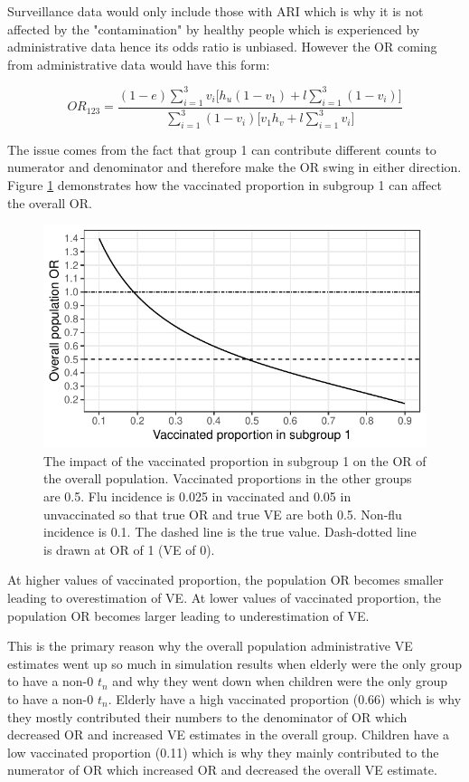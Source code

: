 \documentclass[11pt]{article}
\begin{document}
Surveillance data would only include those with ARI which is why it is not affected by the "contamination" by healthy people which is experienced by administrative data hence its odds ratio is unbiased. However the OR coming from administrative data would have this form:

\begin{equation} \label{ORBad}
OR_{1 2 3} = \frac
{(1-e) \sum_{i=1}^3 v_i \Big[ h_u(1-v_1) + l\sum_{i=1}^3(1-v_i) \Big]}
{\sum_{i=1}^3 (1-v_i) \Big[ v_1h_v+l \sum_{i=1}^3 v_i \Big]}
\end{equation}

The issue comes from the fact that group 1 can contribute different counts to numerator and denominator and therefore make the OR swing in either direction. Figure \ref{fig:ortn} demonstrates how the vaccinated proportion in subgroup 1 can affect the overall OR.

\pagebreak

\begin{figure}[h]
	\centering
		\includegraphics[width=0.75\linewidth]{../fig-ortn/fig-ortn.pdf}
		\caption{
The impact of the vaccinated proportion in subgroup 1 on the OR of the overall population. Vaccinated proportions in the other groups are 0.5. Flu incidence is 0.025 in vaccinated and 0.05 in unvaccinated so that true OR and true VE are both 0.5. Non-flu incidence is 0.1. The dashed line is the true value. Dash-dotted line is drawn at OR of 1 (VE of 0). \label{fig:ortn}
		}
\end{figure}

At higher values of vaccinated proportion, the population OR becomes smaller leading to overestimation of VE. At lower values of vaccinated proportion, the population OR becomes larger leading to underestimation of VE.

This is the primary reason why the overall population administrative VE estimates went up so much in simulation results when elderly were the only group to have a non-0 $t_n$ and why they went down when children were the only group to have a non-0 $t_n$. Elderly have a high vaccinated proportion (0.66) which is why they mostly contributed their numbers to the denominator of OR which decreased OR and increased VE estimates in the overall group. Children have a low vaccinated proportion (0.11) which is why they mainly contributed to the numerator of OR which increased OR and decreased the overall VE estimate. 
\end{document}
